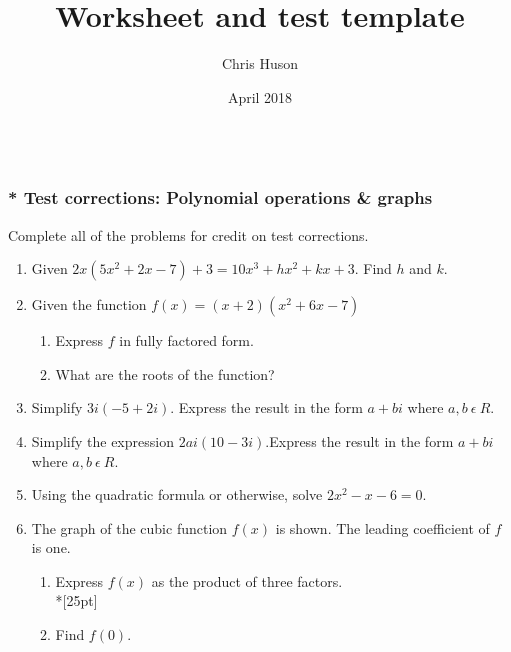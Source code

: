 \documentclass[12pt, oneside]{article}
\title{Worksheet and test template}
\author{Chris Huson}
\date{April 2018}
\begin{document}
\subsubsection*{\\* Test corrections: Polynomial operations \& graphs}
Complete all of the problems for credit on test corrections.

\begin{enumerate}

\item Given $2x(5x^2+2x-7)+3=10x^3+hx^2+kx+3$. Find $h$ and $k$.\\[120pt]

\item Given the function $f(x)=(x+2)(x^2+6x-7)$
\begin{enumerate}
    \item Express $f$ in fully factored form.\\[40pt]
    \item What are the roots of the function?\\[20pt]
\end{enumerate}

\item Simplify $3i(-5+2i)$. Express the result in the form $a+bi$ where $a,b \ \epsilon \ R$.\\[40pt]

\item Simplify the expression $2ai(10-3i)$.Express the result in the form $a+bi$ where $a,b \ \epsilon \ R$.\\[40pt]

\item Using the quadratic formula or otherwise, solve $2x^2-x-6=0$.%

\newpage
\item The graph of the cubic function $f(x)$ is shown. The leading coefficient of $f$ is one.
\begin{enumerate}
    \item Express $f(x)$ as the product of three factors.\\*[25pt]
    \item Find $f(0)$.
\end{enumerate}
\begin{center}
\end{center}


\end{enumerate}
\end{document}
